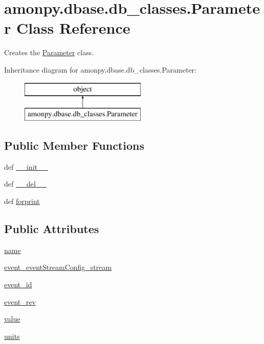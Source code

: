 \hypertarget{classamonpy_1_1dbase_1_1db__classes_1_1_parameter}{\section{amonpy.\-dbase.\-db\-\_\-classes.\-Parameter Class Reference}
\label{classamonpy_1_1dbase_1_1db__classes_1_1_parameter}
}


Creates the \hyperlink{classamonpy_1_1dbase_1_1db__classes_1_1_parameter}{Parameter} class.  


Inheritance diagram for amonpy.\-dbase.\-db\-\_\-classes.\-Parameter\-:\begin{figure}[H]
\begin{center}
\leavevmode
\includegraphics[height=2.000000cm]{d1/d74/classamonpy_1_1dbase_1_1db__classes_1_1_parameter}
\end{center}
\end{figure}
\subsection*{Public Member Functions}
\begin{DoxyCompactItemize}
\item 
def \hyperlink{classamonpy_1_1dbase_1_1db__classes_1_1_parameter_abc3913dc5879e008adb7de677cf34b8e}{\-\_\-\-\_\-init\-\_\-\-\_\-}
\item 
def \hyperlink{classamonpy_1_1dbase_1_1db__classes_1_1_parameter_abac2de24228484435501c9c463761b87}{\-\_\-\-\_\-del\-\_\-\-\_\-}
\item 
def \hyperlink{classamonpy_1_1dbase_1_1db__classes_1_1_parameter_ae24e3a156b51cb1885f55962943dcdef}{forprint}
\end{DoxyCompactItemize}
\subsection*{Public Attributes}
\begin{DoxyCompactItemize}
\item 
\hyperlink{classamonpy_1_1dbase_1_1db__classes_1_1_parameter_a0578aa061ddcf50100cdcbb3851b4c8d}{name}
\item 
\hyperlink{classamonpy_1_1dbase_1_1db__classes_1_1_parameter_af157b9f3c2405f093d65190a6c078bdb}{event\-\_\-event\-Stream\-Config\-\_\-stream}
\item 
\hyperlink{classamonpy_1_1dbase_1_1db__classes_1_1_parameter_abe0eddf1963377c0d06d38e712fe6753}{event\-\_\-id}
\item 
\hyperlink{classamonpy_1_1dbase_1_1db__classes_1_1_parameter_a6908790136a283636be265dcca358567}{event\-\_\-rev}
\item 
\hyperlink{classamonpy_1_1dbase_1_1db__classes_1_1_parameter_ac077e0db5b88e49166cd5066a1ffafe7}{value}
\item 
\hyperlink{classamonpy_1_1dbase_1_1db__classes_1_1_parameter_aafe3f971978610b9e6a29a9853c71c61}{units}
\end{DoxyCompactItemize}
